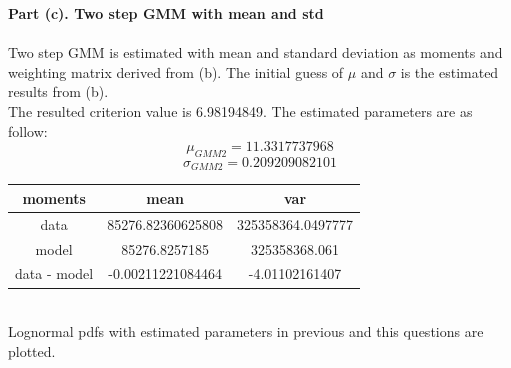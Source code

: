 \documentclass[letterpaper,12pt]{article}
\theoremstyle{definition}
\begin{document}
\clearpage

\noindent\textbf{Part (c). Two step GMM with mean and std} \\
\\
Two step GMM is estimated with mean and standard deviation as moments and weighting matrix derived from (b). The initial guess of $\mu$ and $\sigma$ is the estimated results from (b). \\
The resulted criterion value is 6.98194849. The estimated parameters are as follow:
\[\mu_{GMM2}= 11.3317737968\]
\[\sigma_{GMM2}= 0.209209082101\]

\begin{center}
\begin{tabular}{ c|c|c }
 moments & mean & var \\
 \hline
 data & 85276.82360625808 & 325358364.0497777 \\
 model & 85276.8257185 & 325358368.061 \\
 data - model & -0.00211221084464 & -4.01102161407
\end{tabular}
\end{center}
\\

Lognormal pdfs with estimated parameters in previous and this questions are plotted. \\

\begin{figure}[htb]\centering\captionsetup{width=6.0in}
  \caption{\textbf{}}
\end{figure} \\
\end{document}
